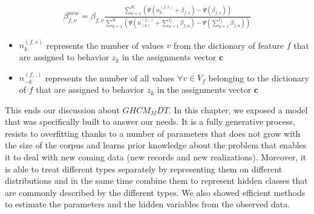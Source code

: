 \begin{equation}\label{betaest}
\begin{split} 
\beta_{f,v}^{new}= \beta_{f,v} \frac{\sum_{k=1}^{K}(\Psi (n^{(f,v)}_{k}+\beta _{f,v})-\Psi (\beta_{f,v}))}{\sum_{k=1}^{K}(\Psi (n^{(f,.)}_{(k)}+\sum_{u=1}^{I_{f}}\beta _{f,u})-\Psi (\sum_{u=1}^{I_{f}}\beta _{f,u}))}
\end{split} 
\end{equation}
\begin{itemize} 
	\item $n^{(f,v)}_{k}$ represents the number of values $v$ from the dictionary of feature $f$ that are assigned to behavior $z_{k}$ in the assignments vector $\mathbf{c}$
	\item $n^{(f,.)}_{-k}$ represents the number of all values $\forall v \in V_{f}$ belonging to the dictionary of $f$ that are assigned to behavior $z_{k}$ in the assignments vector $\mathbf{c}$
\end{itemize} \par

This ends our discussion about $GHCM_MDT$. In this chapter, we exposed a model that was specifically built to answer our needs. It is a fully generative process, resists to overfitting thanks to a number of parameters that does not grow with the size of the corpus and learns prior knowledge about the problem that enables it to deal with new coming data (new records and new realizations). Moreover, it is able to treat different types separately by representing them on different distributions and in the same time combine them to represent hidden classes that are commonly described by the different types. We also showed efficient methods to estimate the parameters and the hidden variables from the observed data.






